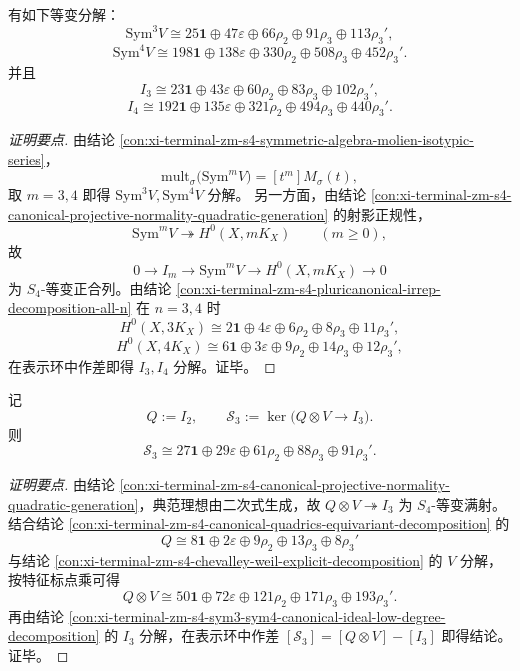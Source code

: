 \begin{conclusion}\label{con:xi-terminal-zm-s4-sym3-sym4-canonical-ideal-low-degree-decomposition}
有如下等变分解：
\[
\mathrm{Sym}^3V
\cong
25\mathbf 1\oplus 47\varepsilon\oplus 66\rho_2\oplus 91\rho_3\oplus 113\rho_3',
\]
\[
\mathrm{Sym}^4V
\cong
198\mathbf 1\oplus 138\varepsilon\oplus 330\rho_2\oplus 508\rho_3\oplus 452\rho_3'.
\]
并且
\[
I_3
\cong
23\mathbf 1\oplus 43\varepsilon\oplus 60\rho_2\oplus 83\rho_3\oplus 102\rho_3',
\]
\[
I_4
\cong
192\mathbf 1\oplus 135\varepsilon\oplus 321\rho_2\oplus 494\rho_3\oplus 440\rho_3'.
\]
\end{conclusion}
\begin{proof}[证明要点]
由结论 \ref{con:xi-terminal-zm-s4-symmetric-algebra-molien-isotypic-series}，
\[
\mathrm{mult}_\sigma\!\bigl(\mathrm{Sym}^mV\bigr)=[t^m]M_\sigma(t),
\]
取 \(m=3,4\) 即得 \(\mathrm{Sym}^3V,\mathrm{Sym}^4V\) 分解。
另一方面，由结论 \ref{con:xi-terminal-zm-s4-canonical-projective-normality-quadratic-generation} 的射影正规性，
\[
\mathrm{Sym}^mV\twoheadrightarrow H^0(X,mK_X)\qquad (m\ge 0),
\]
故
\[
0\to I_m\to \mathrm{Sym}^mV\to H^0(X,mK_X)\to 0
\]
为 \(S_4\)-等变正合列。由结论 \ref{con:xi-terminal-zm-s4-pluricanonical-irrep-decomposition-all-n} 在
\(n=3,4\) 时
\[
H^0(X,3K_X)\cong
2\mathbf 1\oplus 4\varepsilon\oplus 6\rho_2\oplus 8\rho_3\oplus 11\rho_3',
\]
\[
H^0(X,4K_X)\cong
6\mathbf 1\oplus 3\varepsilon\oplus 9\rho_2\oplus 14\rho_3\oplus 12\rho_3',
\]
在表示环中作差即得 \(I_3,I_4\) 分解。证毕。
\end{proof}

\begin{conclusion}\label{con:xi-terminal-zm-s4-linear-syzygy-module-complete-decomposition}
记
\[
Q:=I_2,\qquad
\mathcal S_3:=\ker\!\bigl(Q\otimes V\to I_3\bigr).
\]
则
\[
\mathcal S_3
\cong
27\mathbf 1\oplus 29\varepsilon\oplus 61\rho_2\oplus 88\rho_3\oplus 91\rho_3'.
\]
\end{conclusion}
\begin{proof}[证明要点]
由结论 \ref{con:xi-terminal-zm-s4-canonical-projective-normality-quadratic-generation}，典范理想由二次式生成，故 \(Q\otimes V\twoheadrightarrow I_3\) 为 \(S_4\)-等变满射。
结合结论 \ref{con:xi-terminal-zm-s4-canonical-quadrics-equivariant-decomposition} 的
\[
Q\cong 8\mathbf 1\oplus 2\varepsilon\oplus 9\rho_2\oplus 13\rho_3\oplus 8\rho_3'
\]
与结论 \ref{con:xi-terminal-zm-s4-chevalley-weil-explicit-decomposition} 的 \(V\) 分解，按特征标点乘可得
\[
Q\otimes V
\cong
50\mathbf 1\oplus 72\varepsilon\oplus 121\rho_2\oplus 171\rho_3\oplus 193\rho_3'.
\]
再由结论 \ref{con:xi-terminal-zm-s4-sym3-sym4-canonical-ideal-low-degree-decomposition} 的 \(I_3\) 分解，在表示环中作差
\(
[\mathcal S_3]=[Q\otimes V]-[I_3]
\)
即得结论。证毕。
\end{proof}

